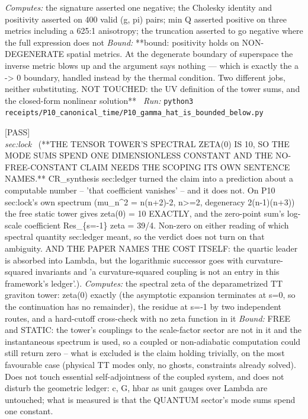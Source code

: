 \begin{description}
\emph{Computes:} the signature asserted one negative; the Cholesky identity and positivity asserted on 400 valid (g, pi) pairs; min Q asserted positive on three metrics including a 625:1 anisotropy; the truncation asserted to go negative where the full expression does not
 \emph{Bound:} **bound: positivity holds on NON-DEGENERATE spatial metrics. At the degenerate boundary of superspace the inverse metric blows up and the argument says nothing --- which is exactly the a -> 0 boundary, handled instead by the thermal condition. Two different jobs, neither substituting. NOT TOUCHED: the UV definition of the tower sums, and the closed-form nonlinear solution**
\ \emph{Run:} \texttt{python3 receipts/P10\_canonical\_time/P10\_gamma\_hat\_is\_bounded\_below.py}
\item[\label{rcpt:P10_the_towers_zeta_at_zero_is_ten_and_the_claim_needs_its_scoping}\texttt{P10\_the\_towers\_zeta\_at\_zero\_is\_ten\_and\_the\_claim\_needs\_its\_scoping}]\hfill\textsf{[PASS]}\\
\textit{sec:lock} \ (**THE TENSOR TOWER'S SPECTRAL ZETA(0) IS 10, SO THE MODE SUMS SPEND ONE DIMENSIONLESS CONSTANT AND THE NO-FREE-CONSTANT CLAIM NEEDS THE SCOPING ITS OWN SENTENCE NAMES.** CR\_synthesis sec:ledger turned the claim into a prediction about a computable number -- 'that coefficient vanishes' -- and it does not. On P10 sec:lock's own spectrum (mu\_n\textasciicircum{}2 = n(n+2)-2, n>=2, degeneracy 2(n-1)(n+3)) the free static tower gives zeta(0) = 10 EXACTLY, and the zero-point sum's log-scale coefficient Res\_\{s=-1\} zeta = 39/4. Non-zero on either reading of which spectral quantity sec:ledger meant, so the verdict does not turn on that ambiguity. AND THE PAPER NAMES THE COST ITSELF: the quartic leader is absorbed into Lambda, but the logarithmic successor goes with curvature-squared invariants and 'a curvature-squared coupling is not an entry in this framework's ledger'.). 
\emph{Computes:} the spectral zeta of the deparametrized TT graviton tower: zeta(0) exactly (the asymptotic expansion terminates at s=0, so the continuation has no remainder), the residue at s=-1 by two independent routes, and a hard-cutoff cross-check with no zeta function in it
 \emph{Bound:} FREE and STATIC: the tower's couplings to the scale-factor sector are not in it and the instantaneous spectrum is used, so a coupled or non-adiabatic computation could still return zero -- what is excluded is the claim holding trivially, on the most favourable case (physical TT modes only, no ghosts, constraints already solved). Does not touch essential self-adjointness of the coupled system, and does not disturb the geometric ledger: c, G, hbar as unit gauges over Lambda are untouched; what is measured is that the QUANTUM sector's mode sums spend one constant.

\end{description}
